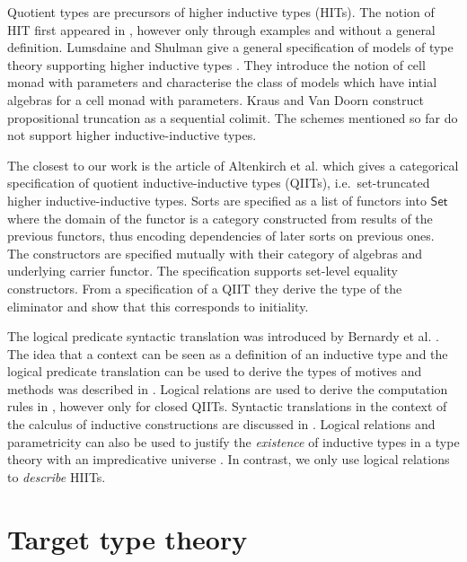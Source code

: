 \documentclass[a4paper,UKenglish]{lipics-v2018}
\newcommand{\Set}{\mathsf{Set}}
\newcommand{\1}{\mathsf{1}} \renewcommand{\Pr}{\mathsf{Pr}}
\begin{document}
Quotient types \cite{hofmann95extensional} are precursors of higher
inductive types (HITs). The notion of HIT first appeared in
\cite{HoTTbook}, however only through examples and without a general
definition.  Lumsdaine and Shulman give a general specification of
models of type theory supporting higher inductive types
\cite{lumsdaineShulman}. They introduce the notion of cell monad with
parameters and characterise the class of models which have intial
algebras for a cell monad with parameters. Kraus \cite{krausprop} and
Van Doorn \cite{doorn} construct propositional truncation as a
sequential colimit. The schemes mentioned so far do not support higher
inductive-inductive types.

The closest to our work is the article of Altenkirch et
al. \cite{gabe} which gives a categorical specification of quotient
inductive-inductive types (QIITs), i.e.\ set-truncated higher
inductive-inductive types. Sorts are specified as a list of functors
into $\Set$ where the domain of the functor is a category constructed
from results of the previous functors, thus encoding dependencies of
later sorts on previous ones. The constructors are specified mutually
with their category of algebras and underlying carrier functor. The
specification supports set-level equality constructors. From a
specification of a QIIT they derive the type of the eliminator and
show that this corresponds to initiality.

The logical predicate syntactic translation was introduced by Bernardy
et al. \cite{bernardy2010parametricity}. The idea that a context can
be seen as a definition of an inductive type and the logical predicate
translation can be used to derive the types of motives and methods was
described in \cite[Section 5.3]{ttintt}. Logical relations are used to
derive the computation rules in \cite[Section 4.3]{kaposi-phd},
however only for closed QIITs. Syntactic translations in the context
of the calculus of inductive constructions are discussed in
\cite{next700}. Logical relations and parametricity can also be used
to justify the \emph{existence} of inductive types in a type theory
with an impredicative universe \cite{atkey}. In contrast, we only use
logical relations to \emph{describe} HIITs.


\section{Target type theory}
\label{sec:target}
\end{document}
